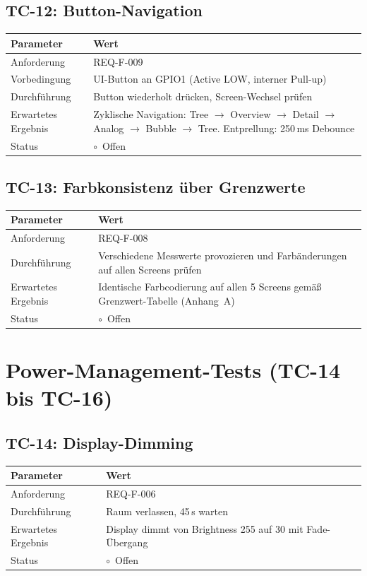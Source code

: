 \documentclass[a4paper,11pt]{article}
\begin{document}
\subsection{TC-12: Button-Navigation}
\begin{tabularx}{\textwidth}{lX}
\toprule
\rowcolor{tableheader}
\textbf{Parameter} & \textbf{Wert} \\
\midrule
Anforderung & REQ-F-009 \\
Vorbedingung & UI-Button an GPIO1 (Active LOW, interner Pull-up) \\
Durchführung & Button wiederholt drücken, Screen-Wechsel prüfen \\
Erwartetes Ergebnis & Zyklische Navigation: Tree $\to$ Overview $\to$ Detail $\to$ Analog $\to$ Bubble $\to$ Tree. Entprellung: 250\,ms Debounce \\
Status & $\circ$~Offen \\
\bottomrule
\end{tabularx}

\subsection{TC-13: Farbkonsistenz über Grenzwerte}
\begin{tabularx}{\textwidth}{lX}
\toprule
\rowcolor{tableheader}
\textbf{Parameter} & \textbf{Wert} \\
\midrule
Anforderung & REQ-F-008 \\
Durchführung & Verschiedene Messwerte provozieren und Farbänderungen auf allen Screens prüfen \\
Erwartetes Ergebnis & Identische Farbcodierung auf allen 5 Screens gemäß Grenzwert-Tabelle (Anhang~A) \\
Status & $\circ$~Offen \\
\bottomrule
\end{tabularx}

\section{Power-Management-Tests (TC-14 bis TC-16)}

\subsection{TC-14: Display-Dimming}
\begin{tabularx}{\textwidth}{lX}
\toprule
\rowcolor{tableheader}
\textbf{Parameter} & \textbf{Wert} \\
\midrule
Anforderung & REQ-F-006 \\
Durchführung & Raum verlassen, 45\,s warten \\
Erwartetes Ergebnis & Display dimmt von Brightness 255 auf 30 mit Fade-Übergang \\
Status & $\circ$~Offen \\
\bottomrule
\end{tabularx}
\end{document}
